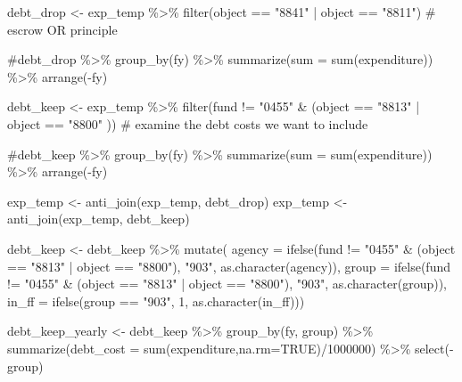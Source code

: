 \documentclass[
  letterpaper,
  DIV=11,
  numbers=noendperiod]{scrreport}
\newenvironment{Shaded}{\begin{snugshade}}{\end{snugshade}}
\newcommand{\AttributeTok}[1]{\textcolor[rgb]{0.40,0.45,0.13}{#1}}
\newcommand{\CommentTok}[1]{\textcolor[rgb]{0.37,0.37,0.37}{#1}}
\newcommand{\ConstantTok}[1]{\textcolor[rgb]{0.56,0.35,0.01}{#1}}
\newcommand{\DecValTok}[1]{\textcolor[rgb]{0.68,0.00,0.00}{#1}}
\newcommand{\FunctionTok}[1]{\textcolor[rgb]{0.28,0.35,0.67}{#1}}
\newcommand{\NormalTok}[1]{\textcolor[rgb]{0.00,0.23,0.31}{#1}}
\newcommand{\OtherTok}[1]{\textcolor[rgb]{0.00,0.23,0.31}{#1}}
\newcommand{\SpecialCharTok}[1]{\textcolor[rgb]{0.37,0.37,0.37}{#1}}
\newcommand{\StringTok}[1]{\textcolor[rgb]{0.13,0.47,0.30}{#1}}
\begin{document}
\begin{Shaded}
\begin{Highlighting}[]
\NormalTok{debt\_drop }\OtherTok{\textless{}{-}}\NormalTok{ exp\_temp }\SpecialCharTok{\%\textgreater{}\%} 
  \FunctionTok{filter}\NormalTok{(object }\SpecialCharTok{==} \StringTok{"8841"} \SpecialCharTok{|}\NormalTok{  object }\SpecialCharTok{==} \StringTok{"8811"}\NormalTok{)  }
\CommentTok{\# escrow  OR  principle}

\CommentTok{\#debt\_drop \%\textgreater{}\% group\_by(fy) \%\textgreater{}\% summarize(sum = sum(expenditure)) \%\textgreater{}\% arrange({-}fy)}


\NormalTok{debt\_keep }\OtherTok{\textless{}{-}}\NormalTok{ exp\_temp }\SpecialCharTok{\%\textgreater{}\%} 
  \FunctionTok{filter}\NormalTok{(fund }\SpecialCharTok{!=} \StringTok{"0455"} \SpecialCharTok{\&}\NormalTok{ (object }\SpecialCharTok{==} \StringTok{"8813"} \SpecialCharTok{|}\NormalTok{ object }\SpecialCharTok{==} \StringTok{"8800"}\NormalTok{ )) }
\CommentTok{\# examine the debt costs we want to include}

\CommentTok{\#debt\_keep \%\textgreater{}\% group\_by(fy) \%\textgreater{}\% summarize(sum = sum(expenditure)) \%\textgreater{}\% arrange({-}fy) }


\NormalTok{exp\_temp }\OtherTok{\textless{}{-}} \FunctionTok{anti\_join}\NormalTok{(exp\_temp, debt\_drop) }
\NormalTok{exp\_temp }\OtherTok{\textless{}{-}} \FunctionTok{anti\_join}\NormalTok{(exp\_temp, debt\_keep)}

\NormalTok{debt\_keep }\OtherTok{\textless{}{-}}\NormalTok{ debt\_keep }\SpecialCharTok{\%\textgreater{}\%}
  \FunctionTok{mutate}\NormalTok{(}
    \AttributeTok{agency =} \FunctionTok{ifelse}\NormalTok{(fund }\SpecialCharTok{!=} \StringTok{"0455"} \SpecialCharTok{\&}\NormalTok{ (object }\SpecialCharTok{==} \StringTok{"8813"} \SpecialCharTok{|}\NormalTok{ object }\SpecialCharTok{==} \StringTok{"8800"}\NormalTok{), }\StringTok{"903"}\NormalTok{, }\FunctionTok{as.character}\NormalTok{(agency)),}
    \AttributeTok{group =} \FunctionTok{ifelse}\NormalTok{(fund }\SpecialCharTok{!=} \StringTok{"0455"} \SpecialCharTok{\&}\NormalTok{ (object }\SpecialCharTok{==} \StringTok{"8813"} \SpecialCharTok{|}\NormalTok{ object }\SpecialCharTok{==} \StringTok{"8800"}\NormalTok{), }\StringTok{"903"}\NormalTok{, }\FunctionTok{as.character}\NormalTok{(group)),}
    \AttributeTok{in\_ff =} \FunctionTok{ifelse}\NormalTok{(group }\SpecialCharTok{==} \StringTok{"903"}\NormalTok{, }\DecValTok{1}\NormalTok{, }\FunctionTok{as.character}\NormalTok{(in\_ff)))}

\NormalTok{debt\_keep\_yearly }\OtherTok{\textless{}{-}}\NormalTok{ debt\_keep }\SpecialCharTok{\%\textgreater{}\%} \FunctionTok{group\_by}\NormalTok{(fy, group) }\SpecialCharTok{\%\textgreater{}\%} \FunctionTok{summarize}\NormalTok{(}\AttributeTok{debt\_cost =} \FunctionTok{sum}\NormalTok{(expenditure,}\AttributeTok{na.rm=}\ConstantTok{TRUE}\NormalTok{)}\SpecialCharTok{/}\DecValTok{1000000}\NormalTok{) }\SpecialCharTok{\%\textgreater{}\%} \FunctionTok{select}\NormalTok{(}\SpecialCharTok{{-}}\NormalTok{group)}
\end{Highlighting}
\end{Shaded}
\end{document}
